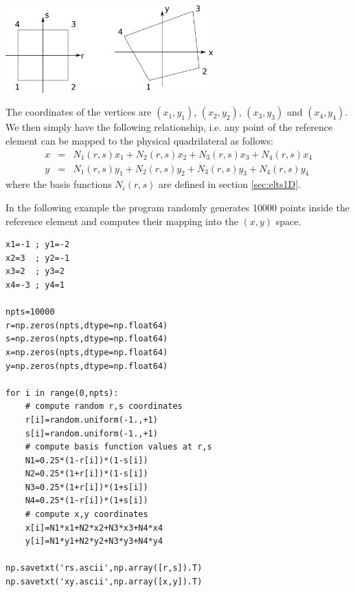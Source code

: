 \begin{center}
\includegraphics[width=8cm]{images/mappings/bilinear/mapping_bilinear.png}
\end{center}

The coordinates of the vertices are 
$(x_1,y_1)$, $(x_2,y_2)$, $(x_3,y_3)$ and $(x_4,y_4)$.
We then simply have the 
following relationship, i.e. any point of the reference element 
can be mapped to the physical quadrilateral as follows:
\begin{eqnarray}
x&=& N_1(r,s) x_1 + N_2(r,s) x_2 + N_3(r,s) x_3 + N_4(r,s) x_4 \\
y&=& N_1(r,s) y_1 + N_2(r,s) y_2 + N_3(r,s) y_3 + N_4(r,s) y_4 
\end{eqnarray} 
where the basis functions $N_i(r,s)$ are defined in section \ref{sec:elts1D}.

In the following example the program randomly generates 10000 points inside the reference 
element and computes their mapping into the $(x,y)$ space. 

\begin{lstlisting}
x1=-1 ; y1=-2
x2=3  ; y2=-1
x3=2  ; y3=2
x4=-3 ; y4=1

npts=10000
r=np.zeros(npts,dtype=np.float64)   
s=np.zeros(npts,dtype=np.float64)   
x=np.zeros(npts,dtype=np.float64)   
y=np.zeros(npts,dtype=np.float64)   

for i in range(0,npts):
    # compute random r,s coordinates
    r[i]=random.uniform(-1.,+1)
    s[i]=random.uniform(-1.,+1)
    # compute basis function values at r,s
    N1=0.25*(1-r[i])*(1-s[i])
    N2=0.25*(1+r[i])*(1-s[i])
    N3=0.25*(1+r[i])*(1+s[i])
    N4=0.25*(1-r[i])*(1+s[i])
    # compute x,y coordinates
    x[i]=N1*x1+N2*x2+N3*x3+N4*x4
    y[i]=N1*y1+N2*y2+N3*y3+N4*y4

np.savetxt('rs.ascii',np.array([r,s]).T)
np.savetxt('xy.ascii',np.array([x,y]).T)
\end{lstlisting}

